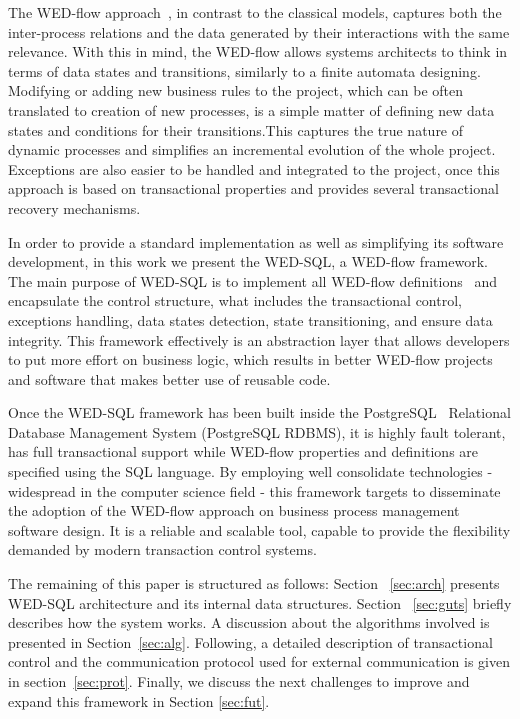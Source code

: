 \documentclass[12pt]{article}
\begin{document}
The WED-flow approach~\cite{ICWS12}, in contrast to the classical models, captures both the inter-process relations  and the data generated by their interactions with the same relevance. With this in mind, the WED-flow allows systems architects to think in terms of data states and transitions, similarly to a finite automata designing. Modifying or adding new business rules to the project, which can be often translated to creation of new processes, is a simple matter of defining new data states and conditions for their transitions.This captures the true nature of dynamic processes and simplifies an incremental evolution  of the whole project. Exceptions are also easier to be handled and integrated to the project, once this approach is based on transactional properties and provides several transactional recovery mechanisms.

 In order to provide a standard implementation as well as simplifying its software development, in this work we present  the WED-SQL, a WED-flow framework. The main purpose of WED-SQL is to implement all WED-flow definitions~\cite{FTPM10} and encapsulate the control structure, what includes the transactional control, exceptions handling, data states detection, state transitioning,  and ensure data integrity. This framework effectively is an abstraction layer that allows developers to put more effort
on business logic, which results in better WED-flow projects and software that makes better use of reusable code. 

 Once the WED-SQL framework has been built inside the PostgreSQL~\cite{PSQL} Relational Database Management System (PostgreSQL RDBMS), it is highly fault tolerant, has full transactional support while WED-flow properties and definitions are specified using the SQL language. By employing well consolidate  technologies - widespread in the computer science field - this framework targets to disseminate the adoption of the WED-flow approach on business process management software design. It is a reliable and scalable tool, capable to provide the flexibility demanded by modern transaction control systems. 

 The remaining of this paper is structured as follows: Section ~\ref{sec:arch} presents WED-SQL architecture and its internal data structures. Section ~\ref{sec:guts} briefly describes how the system works. A discussion about the algorithms involved is presented in Section~\ref{sec:alg}. Following, a detailed description of transactional control and the communication protocol used for external communication is given in section~\ref{sec:prot}. Finally, we discuss the next challenges to improve and expand this framework in Section \ref{sec:fut}.  
\end{document}
